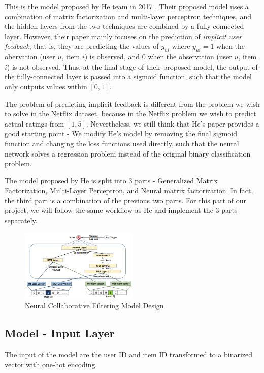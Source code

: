 \documentclass[final]{cvpr}
\begin{document}
This is the model proposed by He team in 2017 \cite{he2017neural}. Their proposed model uses a combination of matrix factorization and multi-layer perceptron techniques, and the hidden layers from the two techniques are combined by a fully-connected layer. However, their paper mainly focuses on the prediction of \textit{implicit user feedback}, that is, they are predicting the values of $y_{ui}$ where $y_{ui}=1$ when the obervation (user $u$, item $i$) is observed, and $0$ when the
observation (user $u$, item $i$) is not observed. Thus, at the final stage of their proposed model, the output of the fully-connected layer is passed into a sigmoid function, such that the model only outputs values within $[0, 1]$. 

The problem of predicting implicit feedback is different from the problem we wish to solve in the Netflix dataset, because in the Netflix problem we wish to predict actual ratings from $[1, 5]$.
Nevertheless, we still think that He's paper provides a good starting point - We modify He's model by removing the final sigmoid function and changing the loss functions used directly, such that the neural network solves a regression problem instead of the original binary
classification problem.

The model proposed by He is split into 3 parts - Generalized Matrix Factorization, Multi-Layer Perceptron, and Neural matrix factorization. In fact, the third part is a combination of the previous two parts. For this part of our project, we will follow the same workflow as He and implement the 3 parts separately. 

\begin{figure}[h]
	\includegraphics[width=0.5\textwidth]{./NeuCF.PNG}
	\caption{Neural Collaborative Filtering Model Design \cite{he2017neural}}
\end{figure}

\subsection{Model - Input Layer}

The input of the model are the user ID and item ID transformed to a binarized vector with one-hot encoding.
\end{document}
